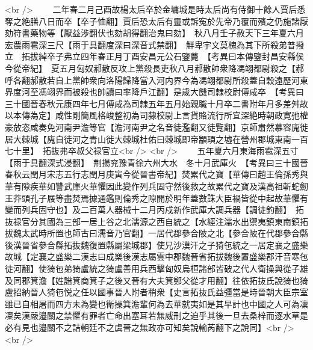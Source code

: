 <br />
　　二年春二月己酉故楊太后卒於金墉城是時太后尚有侍御十餘人賈后悉奪之絶膳八日而卒【卒子恤翻】賈后恐太后有靈或訴寃於先帝乃覆而殯之仍施諸厭劾符書藥物等【厭益涉翻伏也劾胡得翻治鬼曰劾】　秋八月壬子赦天下三年夏六月宏農雨雹深三尺【雨于具翻度深曰深音式禁翻】　鮮卑宇文莫槐為其下所殺弟普撥立　拓拔綽卒子弗立四年春正月丁酉安昌元公石鑒薨　【考異曰本傳鑒封昌安縣侯今從帝紀】　夏五月匈奴郝散反攻上黨殺長吏秋八月郝散帥衆降馮翊都尉殺之【郝呼各翻郝散若自上黨帥衆向洛陽歸降當入河内界今為馮翊都尉所殺蓋自穀遠歷河東界度河至馮翊界而被殺也帥讀曰率降戶江翻】是歲大饑司隸校尉傅咸卒　【考異曰三十國晉春秋元康四年七月傅咸為司隸五年五月始親職十月卒二書附年月多差舛故以本傳為定】咸性剛簡風格峻整初為司隸校尉上言貨賂流行所宜深絶時朝政寛弛權豪放恣咸奏免河南尹澹等官【澹河南尹之名音徒濫翻又徒覽翻】京師肅然慕容廆徙居大棘城【廆自徒河之青山徙大棘城杜佑曰棘城即帝顓頊之墟在營州郡城東南一百七十里】　拓抜弗卒叔父禄官立<br />
<br />
　　五年夏六月東海雨雹深五寸【雨于具翻深式浸翻】　荆揚兖豫青徐六州大水　冬十月武庫火　【考異曰三十國晉春秋云閏月宋志五行志閏月庚寅今從晉書帝紀】焚累代之寶【華傳曰趙王倫孫秀與華有隙疾華如讐武庫火華懼因此變作列兵固守然後救之故累代之寶及漢高祖斬蛇劒王莽頭孔子屐等盡焚焉據通鑑則倫秀之隙開於明年蓋數誅大臣禍皆從中起故華懼有變而列兵固守也】及二百萬人器械十二月丙戍新作武庫大調兵器【調徒釣翻】　拓抜禄官分其國為三部一居上谷之北濡源之西自統之【水經注濡水出禦夷鎮東南鎮拓拔魏太武時所置也師古曰濡音乃官翻】一居代郡參合陂之北【參合陂在代郡參合縣後漢晉省參合縣拓抜魏復置縣屬梁城郡】使兄沙漠汗之子猗㐌統之一居定襄之盛樂故城【定襄之盛樂二漢志曰成樂後漢志屬雲中郡魏晉省拓拔魏後置盛樂郡汗音寒㐌徒河翻】使猗㐌弟猗盧統之猗盧善用兵西擊匈奴烏桓諸部皆破之代人衛操與從子雄及同郡箕澹【姓譜箕商箕子之後又晉有大夫箕鄭父從才用翻】往依拓抜氏說猗也猗盧招納晉人猗㐌悦之任以國事晉人附者稍衆【史言拓抜氏益彊當是時晉朝大臣宗室雖已自相屠而四方未為變也衛操箕澹輩何為去華就夷如是其早計也中國之人可為凜凜矣漢嚴邉關之禁懼有罪者亡命出塞耳若無威刑之迫乎其後一旦去桑梓而逐水草是必有見也邉關不之詰朝廷不之虞晉之無政亦可知矣說輸芮翻下之說同】<br />
<br />

